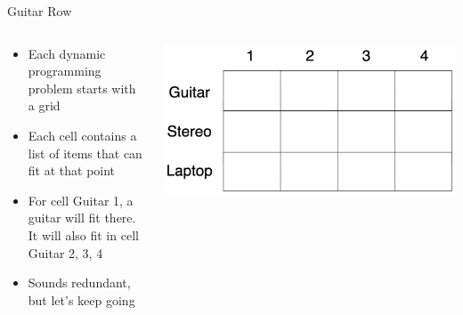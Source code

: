 \documentclass[
  ignorenonframetext,
]{beamer}
\begin{document}
\begin{frame}{Guitar Row}
\protect\hypertarget{guitar-row}{}
\begin{columns}[T]
\begin{column}{0.5\textwidth}
\begin{itemize}
\item
  Each dynamic programming problem starts with a grid
\item
  Each cell contains a list of items that can fit at that point
\item
  For cell Guitar 1, a guitar will fit there. It will also fit in cell
  Guitar 2, 3, 4
\item
  Sounds redundant, but let's keep going
\end{itemize}
\end{column}

\begin{column}{0.5\textwidth}
\includegraphics{images/dynamic.png}
\end{column}
\end{columns}
\end{frame}
\end{document}
